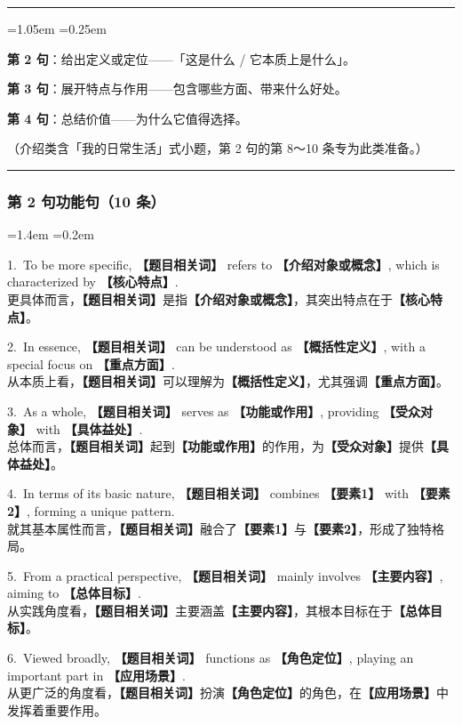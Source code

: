 \documentclass[11pt,a4paper]{ctexart}
\newcommand{\fillin}[1]{{\bfseries【#1】}}
\newenvironment{tpl}[1]{%
  \par\addvspace{7pt}\needspace{4\baselineskip}%
  \noindent{\bfseries\color{accent}#1}\par\nopagebreak
  \vspace{2pt}\noindent\rule{\linewidth}{0.7pt}\par\nopagebreak\vspace{3pt}%
  \begin{list}{}{\leftmargin=1.05em \rightmargin=0.25em \listparindent=0pt
    \itemindent=0pt \topsep=0pt \parsep=2.5pt \itemsep=2.5pt \partopsep=0pt}%
  \item\relax
}{%
  \end{list}\vspace{1pt}\noindent\rule{\linewidth}{0.7pt}\par\addvspace{8pt}%
}
\newenvironment{eg}{%
  \par\addvspace{4pt}%
  \begin{list}{}{\leftmargin=1.4em \rightmargin=0.2em \listparindent=0pt
    \itemindent=0pt \topsep=0pt \parsep=2pt \itemsep=2pt \partopsep=0pt}%
  \item\relax
}{%
  \end{list}\addvspace{5pt}%
}
\begin{document}
\begin{tpl}{介绍类 · 第二段骨架}
\textbf{第 2 句}：给出定义或定位——「这是什么 / 它本质上是什么」。\par
\textbf{第 3 句}：展开特点与作用——包含哪些方面、带来什么好处。\par
\textbf{第 4 句}：总结价值——为什么它值得选择。\par
（介绍类含「我的日常生活」式小题，第 2 句的第 8～10 条专为此类准备。）
\end{tpl}

\subsubsection{第 2 句功能句（10 条）}

\begin{eg}
1.\ To be more specific, \fillin{题目相关词} refers to \fillin{介绍对象或概念}, which is characterized by \fillin{核心特点}.\\
更具体而言，\fillin{题目相关词}是指\fillin{介绍对象或概念}，其突出特点在于\fillin{核心特点}。

2.\ In essence, \fillin{题目相关词} can be understood as \fillin{概括性定义}, with a special focus on \fillin{重点方面}.\\
从本质上看，\fillin{题目相关词}可以理解为\fillin{概括性定义}，尤其强调\fillin{重点方面}。

3.\ As a whole, \fillin{题目相关词} serves as \fillin{功能或作用}, providing \fillin{受众对象} with \fillin{具体益处}.\\
总体而言，\fillin{题目相关词}起到\fillin{功能或作用}的作用，为\fillin{受众对象}提供\fillin{具体益处}。

4.\ In terms of its basic nature, \fillin{题目相关词} combines \fillin{要素1} with \fillin{要素2}, forming a unique pattern.\\
就其基本属性而言，\fillin{题目相关词}融合了\fillin{要素1}与\fillin{要素2}，形成了独特格局。

5.\ From a practical perspective, \fillin{题目相关词} mainly involves \fillin{主要内容}, aiming to \fillin{总体目标}.\\
从实践角度看，\fillin{题目相关词}主要涵盖\fillin{主要内容}，其根本目标在于\fillin{总体目标}。

6.\ Viewed broadly, \fillin{题目相关词} functions as \fillin{角色定位}, playing an important part in \fillin{应用场景}.\\
从更广泛的角度看，\fillin{题目相关词}扮演\fillin{角色定位}的角色，在\fillin{应用场景}中发挥着重要作用。


\end{eg}
\end{document}

